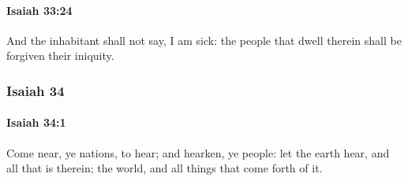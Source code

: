 		\paragraph{Isaiah 33:24} %
			\label{ISAIAH-33-24}

			And the inhabitant shall not say, I am sick: the people that dwell therein shall be forgiven their iniquity.

	\subsubsection{Isaiah 34} %
		\label{ISAIAH-34}

		\paragraph{Isaiah 34:1} %
			\label{ISAIAH-34-1}

			Come near, ye nations, to hear; and hearken, ye people: let the earth hear, and all that is therein; the world, and all things that come forth of it.


